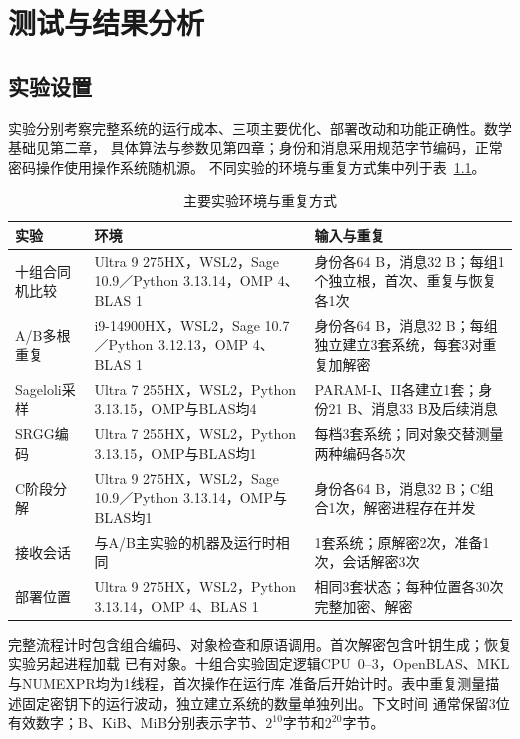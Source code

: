 \chapter{测试与结果分析}

\section{实验设置}
实验分别考察完整系统的运行成本、三项主要优化、部署改动和功能正确性。数学基础见第二章，
具体算法与参数见第四章；身份和消息采用规范字节编码，正常密码操作使用操作系统随机源。
不同实验的环境与重复方式集中列于表~\ref{tab:environments}。

\begin{table}[H]
\centering\small
\caption{主要实验环境与重复方式}
\label{tab:environments}
\begin{tabularx}{\textwidth}{@{}p{}Xp{}@{}}
\toprule
\rowcolor{black!8} 实验 & 环境 & 输入与重复 \\
\midrule
十组合同机比较 & Ultra 9 275HX，WSL2，Sage 10.9／Python 3.13.14，OMP 4、BLAS 1 & 身份各64 B，消息32 B；每组1个独立根，首次、重复与恢复各1次 \\
A/B多根重复 & i9-14900HX，WSL2，Sage 10.7／Python 3.12.13，OMP 4、BLAS 1 & 身份各64 B，消息32 B；每组独立建立3套系统，每套3对重复加解密 \\
Sageloli采样 & Ultra 7 255HX，WSL2，Python 3.13.15，OMP与BLAS均4 & PARAM-I、II各建立1套；身份21 B、消息33 B及后续消息 \\
SRGG编码 & Ultra 7 255HX，WSL2，Python 3.13.15，OMP与BLAS均1 & 每档3套系统；同对象交替测量两种编码各5次 \\
C阶段分解 & Ultra 9 275HX，WSL2，Sage 10.9／Python 3.13.14，OMP与BLAS均1 & 身份各64 B，消息32 B；C组合1次，解密进程存在并发 \\
接收会话 & 与A/B主实验的机器及运行时相同 & 1套系统；原解密2次，准备1次，会话解密3次 \\
部署位置 & Ultra 9 275HX，WSL2，Python 3.13.14，OMP 4、BLAS 1 & 相同3套状态；每种位置各30次完整加密、解密 \\
\bottomrule
\end{tabularx}
\end{table}

完整流程计时包含组合编码、对象检查和原语调用。首次解密包含叶钥生成；恢复实验另起进程加载
已有对象。十组合实验固定逻辑CPU~0--3，OpenBLAS、MKL与NUMEXPR均为1线程，首次操作在运行库
准备后开始计时。表中重复测量描述固定密钥下的运行波动，独立建立系统的数量单独列出。下文时间
通常保留3位有效数字；B、KiB、MiB分别表示字节、$2^{10}$字节和$2^{20}$字节。

